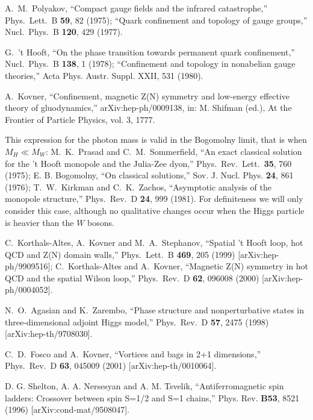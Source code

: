 \documentclass[a4paper,aps,prd,superscriptaddress,showpacs,showkeys]{revtex4}
\begin{document}
\begin{thebibliography}{99}
A.~M.~Polyakov,
``Compact gauge fields and the infrared catastrophe,''
Phys.\ Lett.\ B {\bf 59}, 82 (1975);
``Quark confinement and topology of gauge groups,''
Nucl.\ Phys.\ B {\bf 120}, 429 (1977).

G.~'t Hooft,
``On the phase transition towards permanent quark
confinement,''
Nucl.\ Phys.\ B {\bf 138}, 1 (1978);
``Confinement and topology in nonabelian gauge theories,''
Acta Phys. Austr. Suppl. XXII, 531 (1980).

A.~Kovner,
``Confinement, magnetic Z(N) symmetry and low-energy effective theory of
gluodynamics,'' 
arXiv:hep-ph/{}0009138,
in: M. Shifman (ed.), At the
Frontier of Particle Physics, vol. 3, 1777.

This expression for the photon mass is valid in the Bogomolny
limit, that is when $M_H\ll M_W$: 
M.~K.~Prasad and C.~M.~Sommerfield, 
``An exact classical solution for the 't Hooft
monopole and the Julia-Zee dyon,'' 
Phys.\ Rev.\ Lett.\  {\bf 35}, 760 (1975);
E. B. Bogomolny, 
``On classical solutions,'' 
Sov. J. Nucl. Phys. {\bf 24}, 861 (1976);
T.~W.~Kirkman and C.~K.~Zachos,
``Asymptotic analysis of the monopole structure,''
Phys.\ Rev.\ D {\bf 24}, 999 (1981).
For definiteness we will only
consider this case, although no qualitative changes occur when the
Higgs particle is heavier than the $W$ bosons.

C.~Korthals-Altes, A.~Kovner and M.~A.~Stephanov,
``Spatial 't Hooft loop, hot QCD and Z(N) domain walls,''
Phys.\ Lett.\ B {\bf 469}, 205 (1999)
[arXiv:hep-ph/9909516];
C.~Korthals-Altes and A.~Kovner,
``Magnetic Z(N) symmetry in hot QCD and the spatial Wilson loop,''
Phys.\ Rev.\ D {\bf 62}, 096008 (2000)
[arXiv:hep-ph/0004052].

N.~O.~Agasian and K.~Zarembo,
``Phase structure and nonperturbative states in three-dimensional adjoint
Higgs model,'' 
Phys.\ Rev.\ D {\bf 57}, 2475 (1998)
[arXiv:hep-th/9708030].

C.~D.~Fosco and A.~Kovner,
``Vortices and bags in 2+1 dimensions,''
Phys.\ Rev.\ D {\bf 63}, 045009 (2001)
[arXiv:hep-th/0010064].

D. G. Shelton, A. A. Nersesyan and A. M. Tsvelik,
``Antiferromagnetic spin ladders: Crossover between spin S=1/2 and S=1
chains,''
Phys. Rev. {\bf B53}, 8521 (1996)
[arXiv:cond-mat/9508047].


\end{thebibliography}
\end{document}
